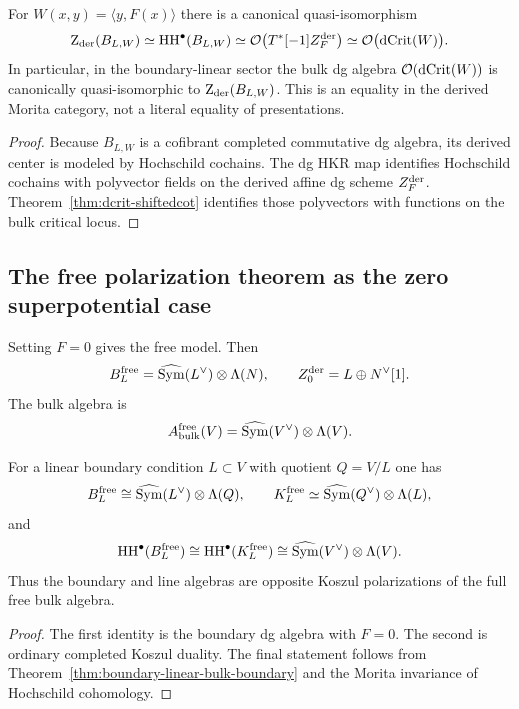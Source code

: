 \begin{theorem}%
For $W(x,y)=\langle y,F(x)\rangle$ there is a canonical quasi-isomorphism
\[
\operatorname{Z}_{\mathrm{der}}(B_{L,W})
\simeq
\operatorname{HH}^\bullet(B_{L,W})
\simeq
\mathcal O\bigl(T^*[-1]Z_F^{\mathrm{der}}\bigr)
\simeq
\mathcal O\bigl(\operatorname{dCrit}(W)\bigr).
\]
In particular, in the boundary-linear sector the bulk dg algebra
\(\mathcal O(\operatorname{dCrit}(W))\) is canonically quasi-isomorphic to
\(\operatorname{Z}_{\mathrm{der}}(B_{L,W})\).  This is an equality in the derived Morita
category, not a literal equality of presentations.
\end{theorem}

\begin{proof}
Because $B_{L,W}$ is a cofibrant completed commutative dg algebra, its derived center is modeled by Hochschild cochains. The dg HKR map identifies Hochschild cochains with polyvector fields on the derived affine dg scheme $Z_F^{\mathrm{der}}$. Theorem~\ref{thm:dcrit-shiftedcot} identifies those polyvectors with functions on the bulk critical locus.
\end{proof}

\subsection{The free polarization theorem as the zero superpotential case}

Setting $F=0$ gives the free model. Then
\[
B_L^{\mathrm{free}}
=
\widehat{\operatorname{Sym}}(L^\vee)\otimes \Lambda(N),
\qquad
Z_0^{\mathrm{der}}=L\oplus N^\vee[1].
\]
The bulk algebra is
\[
A_{\mathrm{bulk}}^{\mathrm{free}}(V)
=
\widehat{\operatorname{Sym}}(V^\vee)\otimes \Lambda(V).
\]

\begin{corollary}%
For a linear boundary condition $L\subset V$ with quotient $Q=V/L$ one has
\[
B_L^{\mathrm{free}}\cong \widehat{\operatorname{Sym}}(L^\vee)\otimes \Lambda(Q),
\qquad
K_L^{\mathrm{free}}\simeq \widehat{\operatorname{Sym}}(Q^\vee)\otimes \Lambda(L),
\]
and
\[
\operatorname{HH}^\bullet(B_L^{\mathrm{free}})
\cong
\operatorname{HH}^\bullet(K_L^{\mathrm{free}})
\cong
\widehat{\operatorname{Sym}}(V^\vee)\otimes \Lambda(V).
\]
Thus the boundary and line algebras are opposite Koszul polarizations of the full free bulk algebra.
\end{corollary}

\begin{proof}
The first identity is the boundary dg algebra with $F=0$. The second is ordinary completed Koszul duality. The final statement follows from Theorem~\ref{thm:boundary-linear-bulk-boundary} and the Morita invariance of Hochschild cohomology.
\end{proof}


